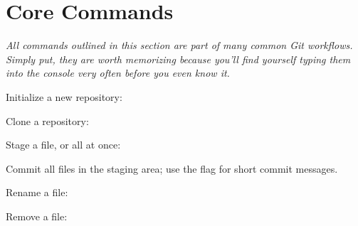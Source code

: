 \section{Core Commands}\label{git-core-commands}

\begin{flushleft}
	\emph{All commands outlined in this section are part of many common Git workflows.
		Simply put, they are worth memorizing because you'll find yourself typing them
		into the console very often before you even know it.}
\end{flushleft}

\begin{flushleft}
	Initialize a new repository:
\end{flushleft}

\begin{flushleft}
\end{flushleft}

\begin{flushleft}
	Clone a repository:
\end{flushleft}

\begin{flushleft}
\end{flushleft}

\begin{flushleft}
	Stage a file, or all at once:
\end{flushleft}

\begin{flushleft}
\end{flushleft}

\begin{flushleft}
	Commit all files in the staging area; use the  flag for short commit messages.
\end{flushleft}

\begin{flushleft}
\end{flushleft}

\begin{flushleft}
	Rename a file:
\end{flushleft}

\begin{flushleft}
\end{flushleft}

\begin{flushleft}
	Remove a file:
\end{flushleft}

